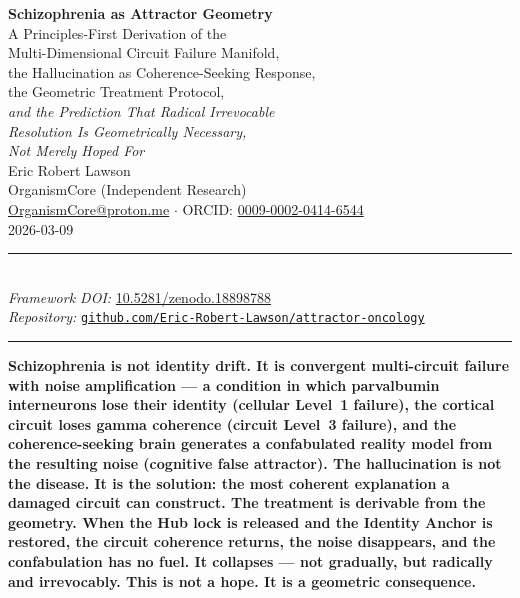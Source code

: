 \documentclass[12pt,a4paper]{article}
\newenvironment{claimenv}{%
  \begin{tcolorbox}[colback=claimbox,colframe=claimbox,coltext=white,
    boxrule=0pt,arc=3pt,left=8pt,right=8pt,top=6pt,bottom=6pt,breakable]
  \bfseries\centering}{%
  \end{tcolorbox}}
\begin{document}

\begin{center}
  {\LARGE\bfseries\color{headerblue}
    Schizophrenia as Attractor Geometry}\\[0.6em]

  {\large
    A Principles-First Derivation of the\\
    Multi-Dimensional Circuit Failure Manifold,\\
    the Hallucination as Coherence-Seeking Response,\\
    the Geometric Treatment Protocol,\\[0.3em]
    \textit{and the Prediction That Radical Irrevocable\\
    Resolution Is Geometrically Necessary,\\
    Not Merely Hoped For}}\\[1.0em]

  {\normalsize Eric Robert Lawson}\\[0.2em]
  {\small OrganismCore (Independent Research)\\
    \href{mailto:OrganismCore@proton.me}{OrganismCore@proton.me}
    \quad$\cdot$\quad
    ORCID: \href{https://orcid.org/0009-0002-0414-6544}
      {0009-0002-0414-6544}}\\[0.5em]

  {\small 2026-03-09}\\[0.7em]
  \rule{0.6\linewidth}{0.4pt}\\[0.5em]

  {\footnotesize
    \textit{Framework DOI:}\;
    \href{https://doi.org/10.5281/zenodo.18898788}
      {10.5281/zenodo.18898788}\\[0.2em]
    \textit{Repository:}\;
    \href{https://github.com/Eric-Robert-Lawson/attractor-oncology}
      {\texttt{github.com/Eric-Robert-Lawson/attractor-oncology}}
  }\\[0.5em]
  \rule{0.6\linewidth}{0.4pt}
\end{center}

\vspace{0.5em}

\begin{claimenv}
Schizophrenia is not identity drift.
It is convergent multi-circuit failure with noise amplification ---
a condition in which parvalbumin interneurons lose their identity
(cellular Level~1 failure), the cortical circuit loses gamma
coherence (circuit Level~3 failure), and the coherence-seeking
brain generates a confabulated reality model from the resulting
noise (cognitive false attractor). The hallucination is not the
disease. It is the solution: the most coherent explanation a
damaged circuit can construct.
The treatment is derivable from the geometry.
When the Hub lock is released and the Identity Anchor is restored,
the circuit coherence returns, the noise disappears, and the
confabulation has no fuel. It collapses --- not gradually, but
radically and irrevocably. This is not a hope. It is a geometric
consequence.
\end{claimenv}
\end{document}
